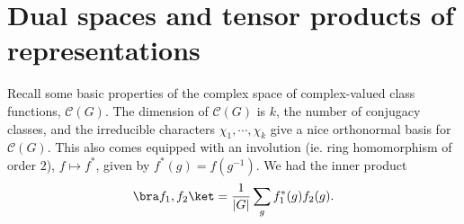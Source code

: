 \documentclass[a4paper]{article}
\begin{document}
\section{Dual spaces and tensor products of representations} %
Recall some basic properties of the complex space of complex-valued class functions, $\mathcal{C}(G)$. The dimension of $\mathcal{C}(G)$ is $k$, the number of conjugacy classes, and the irreducible characters $\chi_1, \cdots, \chi_k$ give a nice orthonormal basis for $\mathcal{C}(G)$. This also comes equipped with an involution (ie. ring homomorphism of order $2$), $f \mapsto f^*$, given by $f^*(g) = f(g^{-1})$. We had the inner product
\[
  \bra f_1, f_2\ket = \frac{1}{|G|} \sum_g f^*_1(g) f_2(g).
\]
\end{document}
